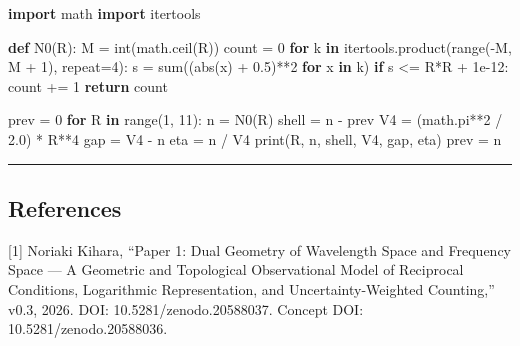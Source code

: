 \documentclass[
]{article}
\newenvironment{Shaded}{}{}
\newcommand{\BuiltInTok}[1]{\textcolor[rgb]{0.00,0.50,0.00}{#1}}
\newcommand{\ControlFlowTok}[1]{\textcolor[rgb]{0.00,0.44,0.13}{\textbf{#1}}}
\newcommand{\DecValTok}[1]{\textcolor[rgb]{0.25,0.63,0.44}{#1}}
\newcommand{\FloatTok}[1]{\textcolor[rgb]{0.25,0.63,0.44}{#1}}
\newcommand{\ImportTok}[1]{\textcolor[rgb]{0.00,0.50,0.00}{\textbf{#1}}}
\newcommand{\KeywordTok}[1]{\textcolor[rgb]{0.00,0.44,0.13}{\textbf{#1}}}
\newcommand{\NormalTok}[1]{#1}
\newcommand{\OperatorTok}[1]{\textcolor[rgb]{0.40,0.40,0.40}{#1}}
\begin{document}
\begin{Shaded}
\begin{Highlighting}[]
\ImportTok{import}\NormalTok{ math}
\ImportTok{import}\NormalTok{ itertools}

\KeywordTok{def}\NormalTok{ N0(R):}
\NormalTok{    M }\OperatorTok{=} \BuiltInTok{int}\NormalTok{(math.ceil(R))}
\NormalTok{    count }\OperatorTok{=} \DecValTok{0}
    \ControlFlowTok{for}\NormalTok{ k }\KeywordTok{in}\NormalTok{ itertools.product(}\BuiltInTok{range}\NormalTok{(}\OperatorTok{{-}}\NormalTok{M, M }\OperatorTok{+} \DecValTok{1}\NormalTok{), repeat}\OperatorTok{=}\DecValTok{4}\NormalTok{):}
\NormalTok{        s }\OperatorTok{=} \BuiltInTok{sum}\NormalTok{((}\BuiltInTok{abs}\NormalTok{(x) }\OperatorTok{+} \FloatTok{0.5}\NormalTok{)}\OperatorTok{**}\DecValTok{2} \ControlFlowTok{for}\NormalTok{ x }\KeywordTok{in}\NormalTok{ k)}
        \ControlFlowTok{if}\NormalTok{ s }\OperatorTok{\textless{}=}\NormalTok{ R}\OperatorTok{*}\NormalTok{R }\OperatorTok{+} \FloatTok{1e{-}12}\NormalTok{:}
\NormalTok{            count }\OperatorTok{+=} \DecValTok{1}
    \ControlFlowTok{return}\NormalTok{ count}

\NormalTok{prev }\OperatorTok{=} \DecValTok{0}
\ControlFlowTok{for}\NormalTok{ R }\KeywordTok{in} \BuiltInTok{range}\NormalTok{(}\DecValTok{1}\NormalTok{, }\DecValTok{11}\NormalTok{):}
\NormalTok{    n }\OperatorTok{=}\NormalTok{ N0(R)}
\NormalTok{    shell }\OperatorTok{=}\NormalTok{ n }\OperatorTok{{-}}\NormalTok{ prev}
\NormalTok{    V4 }\OperatorTok{=}\NormalTok{ (math.pi}\OperatorTok{**}\DecValTok{2} \OperatorTok{/} \FloatTok{2.0}\NormalTok{) }\OperatorTok{*}\NormalTok{ R}\OperatorTok{**}\DecValTok{4}
\NormalTok{    gap }\OperatorTok{=}\NormalTok{ V4 }\OperatorTok{{-}}\NormalTok{ n}
\NormalTok{    eta }\OperatorTok{=}\NormalTok{ n }\OperatorTok{/}\NormalTok{ V4}
    \BuiltInTok{print}\NormalTok{(R, n, shell, V4, gap, eta)}
\NormalTok{    prev }\OperatorTok{=}\NormalTok{ n}
\end{Highlighting}
\end{Shaded}

\begin{center}\rule{0.5\linewidth}{0.5pt}\end{center}

\subsection{References}\label{references}

{[}1{]} Noriaki Kihara, ``Paper 1: Dual Geometry of Wavelength Space and
Frequency Space --- A Geometric and Topological Observational Model of
Reciprocal Conditions, Logarithmic Representation, and
Uncertainty-Weighted Counting,'' v0.3, 2026. DOI:
10.5281/zenodo.20588037. Concept DOI: 10.5281/zenodo.20588036.
\end{document}
